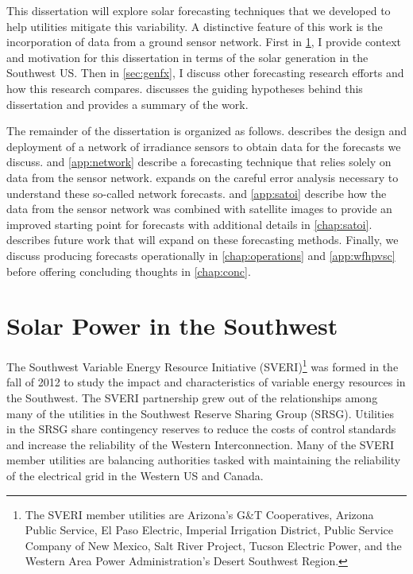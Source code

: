 This dissertation will explore solar forecasting techniques that we
developed to help utilities mitigate this variability.
A distinctive feature of this work is the incorporation of data from a
ground sensor network.
First in \cref{sec:background}, I provide context and motivation for
this dissertation in terms of the solar generation in the Southwest
US.
Then in \cref{sec:genfx}, I discuss other forecasting research efforts
and how this research compares.
 discusses the guiding hypotheses behind this
dissertation and provides a summary of the work.

The remainder of the dissertation is organized as follows.
 describes the design and deployment of a network
of irradiance sensors to obtain data for the forecasts we discuss.
 and \cref{app:network} describe a forecasting
technique that relies solely on data from the sensor network.
 expands on the careful error analysis necessary to
understand these so-called network forecasts.
 and \cref{app:satoi} describe how the data from the
sensor network was combined with satellite images to provide an
improved starting point for forecasts with additional details in
\cref{chap:satoi}.
 describes future work that will expand on
these forecasting methods.
Finally, we discuss producing forecasts operationally in
\cref{chap:operations} and \cref{app:wfhpvsc} before offering
concluding thoughts in \cref{chap:conc}.


\section{Solar Power in the Southwest}
\label{sec:background}

The Southwest Variable Energy Resource Initiative (SVERI)\footnote{The
SVERI member utilities are Arizona's G\&T Cooperatives, Arizona Public
Service, El Paso Electric, Imperial Irrigation District, Public
Service Company of New Mexico, Salt River Project, Tucson Electric
Power, and the Western Area Power Administration's Desert Southwest
Region.} was formed in the fall of 2012 to study the impact and
characteristics of variable energy resources in the Southwest.
The SVERI partnership grew out of the relationships among many of
the utilities in the Southwest Reserve Sharing Group (SRSG).
Utilities in the SRSG share contingency reserves to reduce the costs
of control standards and increase the reliability of the Western
Interconnection.
Many of the SVERI member utilities are balancing authorities tasked
with maintaining the reliability of the electrical grid in the Western
US and Canada.


